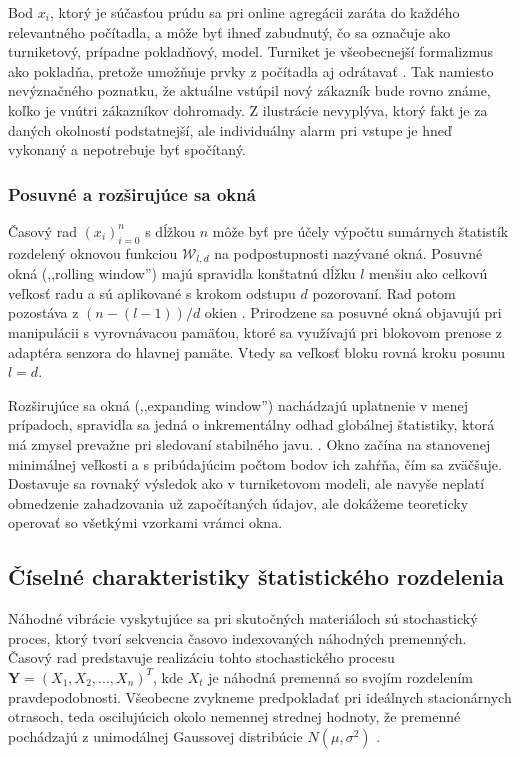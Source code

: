 Bod $x_i$, ktorý je súčasťou prúdu sa pri online agregácii zaráta do každého relevantného počítadla, a môže byť ihneď zabudnutý, čo sa 
označuje ako turniketový, prípadne pokladňový, model. Turniket je všeobecnejší formalizmus ako pokladňa, pretože umožňuje prvky z 
počítadla aj odrátavať \cite{data-streams}. Tak namiesto nevýznačného poznatku, že aktuálne vstúpil nový zákazník bude rovno známe, 
koľko je vnútri zákazníkov dohromady. Z ilustrácie nevyplýva, ktorý fakt je za daných okolností podstatnejší, ale individuálny alarm 
pri vstupe je hneď vykonaný a nepotrebuje byť spočítaný. 

\subsubsection{Posuvné a rozširujúce sa okná}
Časový rad $\left(x_i\right)_{i = 0}^{n}$ s dĺžkou $n$ môže byť pre účely výpočtu sumárnych štatistík rozdelený oknovou funkciou 
$\mathcal{W}_{l, d}$ na podpostupnosti nazývané okná. Posuvné okná (,,rolling window'') majú spravidla konštatnú dĺžku $l$ 
menšiu ako celkovú veľkosť radu a sú aplikované s krokom odstupu $d$ pozorovaní. Rad potom pozostáva z $ (n - (l  - 1)) / d$ okien 
\cite{online-anomaly-detection}. Prirodzene sa posuvné okná objavujú pri manipulácii s vyrovnávacou pamäťou, ktoré sa využívajú pri blokovom prenose z adaptéra senzora do hlavnej pamäte. Vtedy sa veľkosť bloku rovná kroku posunu $l = d$.

Rozširujúce sa okná (,,expanding window'') nachádzajú uplatnenie v menej prípadoch, spravidla sa jedná o inkrementálny 
odhad globálnej štatistiky, ktorá má zmysel prevažne pri sledovaní stabilného javu. \cite{practical-time-series}. Okno začína na 
stanovenej minimálnej veľkosti a s pribúdajúcim počtom bodov ich zahŕňa, čím sa zväčšuje. Dostavuje sa rovnaký výsledok ako v 
turniketovom modeli, ale navyše neplatí obmedzenie zahadzovania už započítaných údajov, ale dokážeme teoreticky operovať so všetkými 
vzorkami vrámci okna.  

\subsection{Číselné charakteristiky štatistického rozdelenia}
Náhodné vibrácie vyskytujúce sa pri skutočných materiáloch sú stochastický proces, ktorý tvorí sekvencia časovo indexovaných 
náhodných premenných. Časový rad predstavuje realizáciu tohto stochastického procesu $\mathbf{Y} = (X_1, X_2, ..., X_n)^T$, kde $X_t$ 
je náhodná premenná so svojím rozdelením pravdepodobnosti. Všeobecne zvykneme predpokladať pri ideálnych stacionárnych otrasoch, teda 
oscilujúcich okolo nemennej strednej hodnoty, že premenné pochádzajú z unimodálnej Gaussovej distribúcie $N(\mu, \sigma^2)$  
\cite{vibrations-shock}. 

